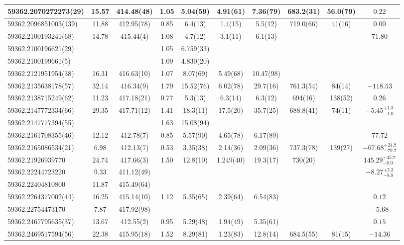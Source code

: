 {{\begin{longtable}{lccccccccc}
\hline
59362.2070272273(29) & 15.57 & 414.48(48) & 1.05 & 5.04(59) & 4.91(61)  & 7.36(79) & 683.2(31) & 56.0(79) & $0.22$ \\
\hline
59362.2096851003(139) & 11.88 & 412.95(78) & 0.85 & 6.4(13) & 1.4(15)  & 5.5(12) & 719.0(66) & 41(16) & $0.00$ \\
\hline
59362.2100193241(68) & 14.78 & 415.44(4) & 1.08 & 4.7(12) & 3.1(11)  & 6.1(13) &  &  & $71.80$ \\
59362.2100196621(29)  &  & & 1.05 & 6.759(33) &  &  &    &  &  \\
59362.2100199661(5)  &  & & 1.09 & 4.830(20) &  &  &    &  &  \\
\hline
59362.2121951954(38) & 16.31 & 416.63(10) & 1.07 & 8.07(69) & 5.49(68)  & 10.47(98) &  &  &  \\
\hline
59362.2135638178(57) & 32.14 & 416.34(9) & 1.79 & 15.52(76) & 6.02(78)  & 29.7(16) & 761.3(54) & 84(14) & $-118.53$ \\
\hline
59362.2138715249(62) & 11.23 & 417.18(21) & 0.77 & 5.3(13) & 6.3(14)  & 6.3(12) & 694(16) & 138(52) & $0.26$ \\
\hline
59362.2147772334(66) & 29.35 & 417.71(12) & 1.41 & 18.3(11) & 17.5(20)  & 35.7(25) & 688.8(41) & 74(11) & $-5.45^{+1.3}_{-1.0}$ \\
59362.2147777394(55) & &  & 1.63 & 15.08(94) &  &  &  &  &  \\
\hline
59362.2161708355(46) & 12.12 & 412.78(7) & 0.85 & 5.57(90) & 4.65(78)  & 6.17(89) &  &  & $77.72$ \\
\hline
59362.2165086534(21) & 6.98 & 412.13(7) & 0.53 & 3.35(38) & 2.14(36)  & 2.09(36) & 737.3(78) & 139(27) & $-67.68^{+24.9}_{-79.7}$ \\
\hline
59362.21926939770 & 24.74 & 417.66(3) & 1.50 & 12.8(10) & 1.249(40)  & 19.3(17) & 730(20) &  & $145.29^{+45.7}_{-0.0}$ \\
\hline
59362.22244723220 & 9.33 & 411.12(49) &  &  &    &  &  &  & $-8.27^{+2.3}_{-8.8}$ \\
\hline
59362.22404810800 & 11.87 & 415.49(64) &  &  &  &  &  &  &  \\
\hline
59362.2264377002(44) & 16.25 & 415.14(10) & 1.12 & 5.35(65) & 2.39(64)  & 6.54(83) &  &  & $0.12$ \\
\hline
59362.22754473170 & 7.87 & 417.92(98) &  &  & 
&  &  &  & $-5.68$ \\
\hline
59362.2467795635(37) & 13.67 & 412.55(2) & 0.95 & 5.29(48) & 1.94(49)  & 5.35(61) &  &  & $0.15$ \\
\hline
59362.2469517594(56) & 22.38 & 415.95(18) & 1.52 & 8.29(81) & 1.23(83)  & 12.8(14) & 684.5(55) & 81(15) & $-14.36$ \\

\end{longtable}}}
